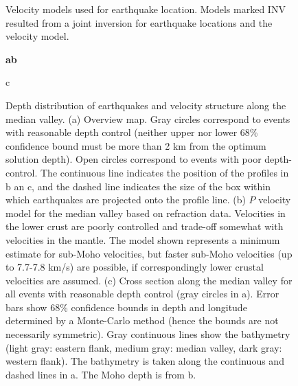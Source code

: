 \documentclass[jgr]{aguplus}
\begin{document}
\begin{figure}
\caption{Velocity models used for earthquake location.  Models marked INV resulted from a joint inversion for earthquake locations and the velocity model.}
\label{fig:velmod}
\end{figure}



\begin{figure}
\large \sf \bf a\hspace{14pc}b


\begin{flushleft}c\end{flushleft}


\caption{Depth distribution of earthquakes and velocity structure
along the median valley.
(a) Overview map.  Gray  circles correspond to
events with reasonable depth control (neither upper nor lower 68\% confidence
bound must be more than 2 km from the optimum solution depth). Open circles correspond
to events with poor depth-control. The continuous line indicates the position
of the profiles in b an c, and the dashed line indicates the size of
the box within which earthquakes are projected onto the profile line.
 (b) $P$ velocity model for the median valley based on
refraction data. Velocities in the lower crust are poorly controlled
and trade-off somewhat with velocities in the mantle.  The model shown
represents a minimum estimate for
sub-Moho velocities, but faster sub-Moho velocities (up to 7.7-7.8
km/s) are possible, if correspondingly lower crustal velocities are
assumed.
(c) Cross section along the median valley for all events with
reasonable depth control (gray circles in a).  Error bars show
68\% confidence bounds in depth and longitude determined by a
Monte-Carlo method (hence the bounds are not necessarily symmetric).
Gray continuous lines show the bathymetry (light gray: eastern flank,
medium gray: median valley, dark gray: western flank). The bathymetry
is taken along the continuous and dashed lines in a. The Moho depth is from b.}
\label{fig:croslon}
\end{figure}

\clearpage
\end{document}
